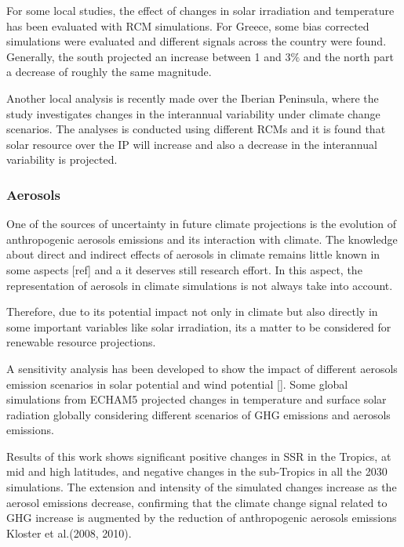 For some local studies, the effect of changes in solar irradiation and temperature has been evaluated with RCM simulations. For Greece, some bias corrected simulations were evaluated and different signals across the country were found. Generally, the south projected an increase between 1 and 3$\%$ and the north part a decrease of roughly the same magnitude. 

Another local analysis is recently made over the Iberian Peninsula, where the study investigates changes in the interannual variability under climate change scenarios. The analyses is conducted using different RCMs and it is found that solar resource over the IP will increase and also a decrease in the interannual variability is projected.

\subsubsection{Aerosols}

One of the sources of uncertainty in future climate projections is the evolution of anthropogenic aerosols emissions and its interaction with climate. The knowledge about direct and indirect effects of aerosols in climate remains little known in some aspects [ref] and a it deserves still research effort. In this aspect, the representation of aerosols in climate simulations is not always take into account.  

Therefore, due to its potential impact not only in climate but also directly in some important variables like solar irradiation, its a matter to be considered for renewable resource projections.

A sensitivity analysis has been developed to show the impact of different aerosols emission scenarios in solar potential and wind potential []. Some global simulations from ECHAM5 projected changes in temperature and surface solar radiation globally considering different scenarios of GHG emissions and aerosols emissions. 

Results of this work shows significant positive changes in SSR in the Tropics, at mid and high latitudes, and negative changes in the sub-Tropics in all the 2030 simulations. The extension and intensity of the simulated changes increase as the aerosol emissions decrease, confirming that the climate change signal related to GHG increase is augmented by the reduction of anthropogenic aerosols emissions Kloster et al.(2008, 2010).


